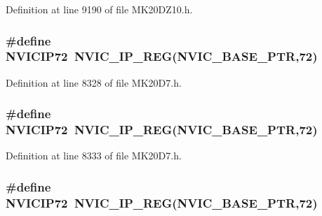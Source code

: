 Definition at line 9190 of file M\+K20\+D\+Z10.\+h.

\subsubsection[{\texorpdfstring{N\+V\+I\+C\+I\+P72}{NVICIP72}}]{\setlength{\rightskip}{0pt plus 5cm}\#define N\+V\+I\+C\+I\+P72~{\bf N\+V\+I\+C\+\_\+\+I\+P\+\_\+\+R\+EG}({\bf N\+V\+I\+C\+\_\+\+B\+A\+S\+E\+\_\+\+P\+TR},72)}\hypertarget{group___n_v_i_c___register___accessor___macros_ga3e3e1c3baad6e9d3e35893e1f02be1c3}{}\label{group___n_v_i_c___register___accessor___macros_ga3e3e1c3baad6e9d3e35893e1f02be1c3}


Definition at line 8328 of file M\+K20\+D7.\+h.

\subsubsection[{\texorpdfstring{N\+V\+I\+C\+I\+P72}{NVICIP72}}]{\setlength{\rightskip}{0pt plus 5cm}\#define N\+V\+I\+C\+I\+P72~{\bf N\+V\+I\+C\+\_\+\+I\+P\+\_\+\+R\+EG}({\bf N\+V\+I\+C\+\_\+\+B\+A\+S\+E\+\_\+\+P\+TR},72)}\hypertarget{group___n_v_i_c___register___accessor___macros_ga3e3e1c3baad6e9d3e35893e1f02be1c3}{}\label{group___n_v_i_c___register___accessor___macros_ga3e3e1c3baad6e9d3e35893e1f02be1c3}


Definition at line 8333 of file M\+K20\+D7.\+h.

\subsubsection[{\texorpdfstring{N\+V\+I\+C\+I\+P72}{NVICIP72}}]{\setlength{\rightskip}{0pt plus 5cm}\#define N\+V\+I\+C\+I\+P72~{\bf N\+V\+I\+C\+\_\+\+I\+P\+\_\+\+R\+EG}({\bf N\+V\+I\+C\+\_\+\+B\+A\+S\+E\+\_\+\+P\+TR},72)}\hypertarget{group___n_v_i_c___register___accessor___macros_ga3e3e1c3baad6e9d3e35893e1f02be1c3}{}\label{group___n_v_i_c___register___accessor___macros_ga3e3e1c3baad6e9d3e35893e1f02be1c3}


